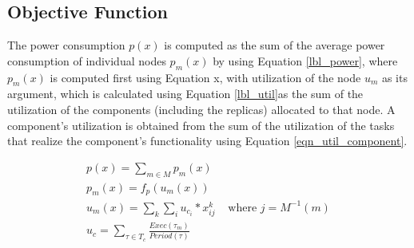 
\subsection{Objective Function}
The power consumption $p(x)$ is computed as the sum of the average power consumption of individual nodes $p_m(x)$ by using Equation \ref{lbl_power}, where $p_m(x)$ is computed first using Equation x, with utilization of the node $u_m$ as its argument, which is calculated using Equation \ref{lbl_util}as the sum of the utilization of the components (including the replicas) allocated to that node. A component's utilization is obtained from the sum of the utilization of the tasks that realize the component's functionality using Equation \ref{eqn_util_component}.

\begin{align}
\label{eqn_avgpowerconsumption_util}
p(x) = \sum\limits_{m\in M}{p_{m}(x)}&\\
\label{lbl_power}
p_{m}(x) = f_p(u_{m}{(x)})&\\
\label{lbl_util}
u_{m}{(x)} = \sum_k{\sum_i{u_{c_i}*x^k_{ij}}} & \text{ where }j=M^{-1}(m)\\
\label{eqn_util_component}
u_c = \sum_{\tau\in T_{c}} \frac{Exec(\tau_{m})}{Period(\tau)}&
\end{align}

